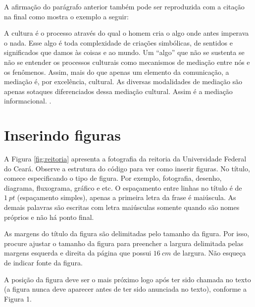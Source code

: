    A afirmação do parágrafo anterior também pode ser reproduzida com a citação na final como mostra o exemplo a seguir: 
    \begin{citacao}
        A cultura é o processo através do qual o homem cria o algo onde antes imperava o nada. Esse algo é toda complexidade de criações simbólicas, de sentidos e significados que damos às coisas e ao mundo. Um “algo” que não se sustenta se não se entender os processos culturais como mecanismos de mediação entre nós e os fenômenos. Assim, mais do que apenas um elemento da comunicação, a mediação é, por excelência, cultural. As diversas modalidades de mediação são apenas sotaques diferenciados dessa mediação cultural. Assim é a mediação informacional. \cite[p.~98]{feitosa2016}.
    \end{citacao}
        

\section{Inserindo figuras}\label{sec:figuras}
    
    A Figura \ref{fig:reitoria} apresenta a fotografia da reitoria da Universidade Federal do Ceará. Observe a estrutura do código para ver como inserir figuras. No título, comece especificando o tipo de figura. Por exemplo, fotografia, desenho, diagrama, fluxograma, gráfico e etc. O espaçamento entre linhas no título é de $1~pt$ (espaçamento simples), apenas a primeira letra da frase é maiúscula. As demais palavras são escritas com letra maiúsculas somente quando são nomes próprios e não há ponto final. 
    
    As margens do título da figura são delimitadas pelo tamanho da figura. Por isso, procure ajustar o tamanho da figura para preencher a largura delimitada pelas margens esquerda e direita da página que possui $16~cm$ de largura. Não esqueça de indicar fonte da figura. 
    
    A posição da figura deve ser o mais próximo logo após ter sido chamada no texto (a figura nunca deve aparecer antes de ter sido anunciada no texto), conforme a Figura 1. 
    
